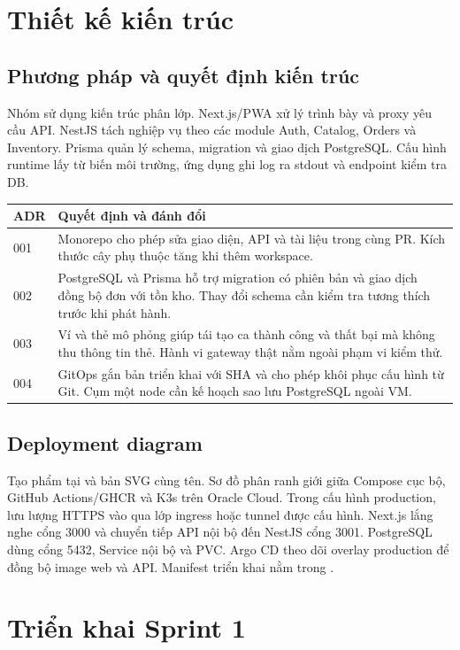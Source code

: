 \documentclass[a4paper]{article}
\begin{document}
\section{Thiết kế kiến trúc}

\subsection{Phương pháp và quyết định kiến trúc}
Nhóm sử dụng kiến trúc phân lớp. Next.js/PWA xử lý trình bày và proxy yêu cầu API. NestJS tách nghiệp vụ theo các module Auth, Catalog, Orders và Inventory. Prisma quản lý schema, migration và giao dịch PostgreSQL. Cấu hình runtime lấy từ biến môi trường, ứng dụng ghi log ra stdout và endpoint  kiểm tra DB.

\begin{tabularx}{\linewidth}{@{}l X@{}}
\toprule
\textbf{ADR} & \textbf{Quyết định và đánh đổi}\\
\midrule
001 & Monorepo cho phép sửa giao diện, API và tài liệu trong cùng PR. Kích thước cây phụ thuộc tăng khi thêm workspace.\\
002 & PostgreSQL và Prisma hỗ trợ migration có phiên bản và giao dịch đồng bộ đơn với tồn kho. Thay đổi schema cần kiểm tra tương thích trước khi phát hành.\\
003 & Ví và thẻ mô phỏng giúp tái tạo ca thành công và thất bại mà không thu thông tin thẻ. Hành vi gateway thật nằm ngoài phạm vi kiểm thử.\\
004 & GitOps gắn bản triển khai với SHA và cho phép khôi phục cấu hình từ Git. Cụm một node cần kế hoạch sao lưu PostgreSQL ngoài VM.\\
\bottomrule
\end{tabularx}

\subsection{Deployment diagram}
Tạo phẩm tại  và bản SVG cùng tên. Sơ đồ phân ranh giới giữa Compose cục bộ, GitHub Actions/GHCR và K3s trên Oracle Cloud. Trong cấu hình production, lưu lượng HTTPS vào qua lớp ingress hoặc tunnel được cấu hình. Next.js lắng nghe cổng 3000 và chuyển tiếp API nội bộ đến NestJS cổng 3001. PostgreSQL dùng cổng 5432, Service nội bộ và PVC. Argo CD theo dõi overlay production để đồng bộ image web và API. Manifest triển khai nằm trong .

\section{Triển khai Sprint 1}
\end{document}
